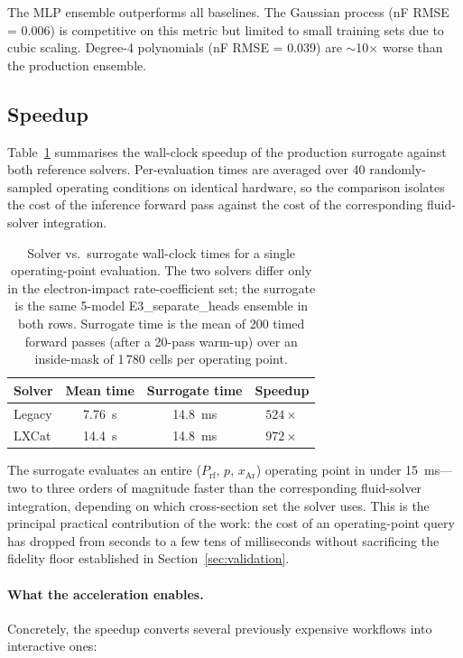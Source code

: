 \documentclass[12pt,a4paper]{article}
\begin{document}
The MLP ensemble outperforms all baselines.  The Gaussian process
(nF RMSE = 0.006) is competitive on this metric but limited to small
training sets due to cubic scaling.  Degree-4 polynomials
(nF RMSE = 0.039) are $\sim$10$\times$ worse than the production
ensemble.

\subsection{Speedup}
\label{sec:speedup}

Table~\ref{tab:speedup} summarises the wall-clock speedup of the
production surrogate against both reference solvers.  Per-evaluation
times are averaged over 40 randomly-sampled operating conditions on
identical hardware, so the comparison isolates the cost of the inference
forward pass against the cost of the corresponding fluid-solver
integration.

\begin{table}[H]
  \centering
  \caption{Solver vs.\ surrogate wall-clock times for a single
operating-point evaluation.  The two solvers differ only in the
electron-impact rate-coefficient set; the surrogate is the same
5-model E3\_separate\_heads ensemble in both rows.  Surrogate time is
the mean of 200 timed forward passes (after a 20-pass warm-up) over an
inside-mask of 1\,780 cells per operating point.}
  \label{tab:speedup}
  \begin{tabular}{lccc}
    \toprule
    Solver & Mean time & Surrogate time & Speedup \\
    \midrule
    Legacy & \SI{7.76}{\second} & \SI{14.8}{\milli\second}
           & $524\times$ \\
    LXCat  & \SI{14.4}{\second} & \SI{14.8}{\milli\second}
           & $972\times$ \\
    \bottomrule
  \end{tabular}
\end{table}

The surrogate evaluates an entire (\(P_\mathrm{rf}\), \(p\),
\(x_\mathrm{Ar}\)) operating point in under \SI{15}{\milli\second}---two
to three orders of magnitude faster than the corresponding fluid-solver
integration, depending on which cross-section set the solver uses.  This
is the principal practical contribution of the work: the cost of an
operating-point query has dropped from seconds to a few tens of
milliseconds without sacrificing the fidelity floor established in
Section~\ref{sec:validation}.

\paragraph{What the acceleration enables.}
Concretely, the speedup converts several previously expensive workflows
into interactive ones:
\end{document}
